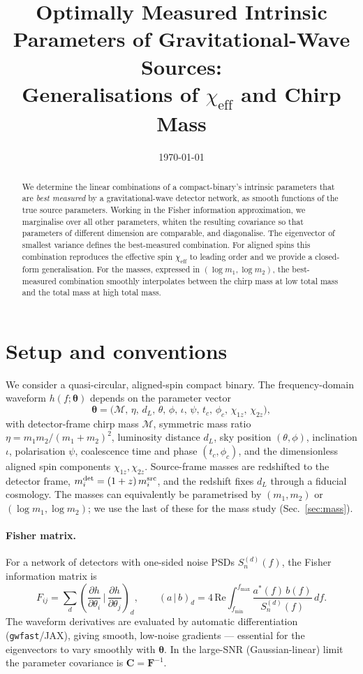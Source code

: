 \documentclass[11pt]{article}
\title{Optimally Measured Intrinsic Parameters of Gravitational-Wave Sources:\\
Generalisations of $\chi_{\mathrm{eff}}$ and Chirp Mass}
\author{}
\date{\today}
\newcommand{\chieff}{\chi_{\mathrm{eff}}}
\newcommand{\Mc}{\mathcal{M}}
\newcommand{\Fisher}{\bm{F}}
\newcommand{\Cov}{\bm{C}}
\newcommand{\vth}{\bm{\theta}}
\begin{document}
\maketitle

\begin{abstract}
We determine the linear combinations of a compact-binary's intrinsic parameters
that are \emph{best measured} by a gravitational-wave detector network, as
smooth functions of the true source parameters. Working in the Fisher
information approximation, we marginalise over all other parameters, whiten the
resulting covariance so that parameters of different dimension are comparable,
and diagonalise. The eigenvector of smallest variance defines the best-measured
combination. For aligned spins this combination reproduces the effective spin
$\chieff$ to leading order and we provide a closed-form generalisation. For the
masses, expressed in $(\log m_1,\log m_2)$, the best-measured combination
smoothly interpolates between the chirp mass at low total mass and the total
mass at high total mass.
\end{abstract}

\section{Setup and conventions}

We consider a quasi-circular, aligned-spin compact binary. The frequency-domain
waveform $h(f;\vth)$ depends on the parameter vector
\begin{equation}
  \vth = \bigl(\Mc,\,\eta,\,d_L,\,\theta,\,\phi,\,\iota,\,\psi,\,t_c,\,\phi_c,\,
  \chi_{1z},\,\chi_{2z}\bigr),
\end{equation}
with detector-frame chirp mass $\Mc$, symmetric mass ratio
$\eta=m_1 m_2/(m_1+m_2)^2$, luminosity distance $d_L$, sky position
$(\theta,\phi)$, inclination $\iota$, polarisation $\psi$, coalescence time and
phase $(t_c,\phi_c)$, and the dimensionless aligned spin components
$\chi_{1z},\chi_{2z}$. Source-frame masses are redshifted to the detector frame,
$m_i^{\rm det}=(1+z)\,m_i^{\rm src}$, and the redshift fixes $d_L$ through a
fiducial cosmology. The masses can equivalently be parametrised by
$(m_1,m_2)$ or $(\log m_1,\log m_2)$; we use the last of these for the mass
study (Sec.~\ref{sec:mass}).

\paragraph{Fisher matrix.}
For a network of detectors with one-sided noise PSDs $S_n^{(d)}(f)$, the Fisher
information matrix is
\begin{equation}
  F_{ij} = \sum_d \left( \frac{\partial h}{\partial \theta_i}\,\Big|\,
  \frac{\partial h}{\partial \theta_j} \right)_d,
  \qquad
  (a\,|\,b)_d = 4\,\mathrm{Re}\!\int_{f_{\min}}^{f_{\max}}
  \frac{a^*(f)\,b(f)}{S_n^{(d)}(f)}\,df .
  \label{eq:fisher}
\end{equation}
The waveform derivatives are evaluated by automatic differentiation
(\texttt{gwfast}/JAX), giving smooth, low-noise gradients --- essential for the
eigenvectors to vary smoothly with $\vth$. In the large-SNR (Gaussian-linear)
limit the parameter covariance is $\Cov=\Fisher^{-1}$.
\end{document}
